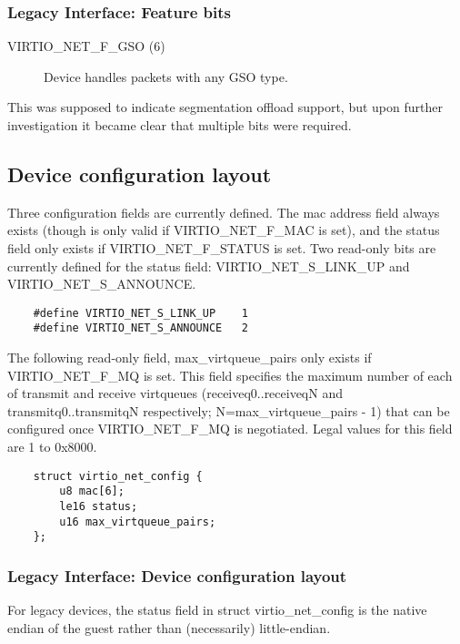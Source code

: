 \subsubsection{Legacy Interface: Feature bits}\label{sec:Device Types / Network Device / Feature bits / Legacy Interface: Feature bits}
\begin{description}
\item[VIRTIO_NET_F_GSO (6)] Device handles packets with any GSO type.
\end{description}

This was supposed to indicate segmentation offload support, but
upon further investigation it became clear that multiple bits
were required.

\subsection{Device configuration layout}\label{sec:Device Types / Network Device / Device configuration layout}

Three configuration fields are currently defined. The mac address field
always exists (though is only valid if VIRTIO_NET_F_MAC is set), and
the status field only exists if VIRTIO_NET_F_STATUS is set. Two
read-only bits are currently defined for the status field:
VIRTIO_NET_S_LINK_UP and VIRTIO_NET_S_ANNOUNCE.

\begin{lstlisting}
	#define VIRTIO_NET_S_LINK_UP	1
	#define VIRTIO_NET_S_ANNOUNCE	2
\end{lstlisting}

The following read-only field, max_virtqueue_pairs only exists if
VIRTIO_NET_F_MQ is set. This field specifies the maximum number
of each of transmit and receive virtqueues (receiveq0..receiveqN
and transmitq0..transmitqN respectively;
 N=max_virtqueue_pairs - 1) that can be configured once VIRTIO_NET_F_MQ
is negotiated.  Legal values for this field are 1 to 0x8000.

\begin{lstlisting}
	struct virtio_net_config {
		u8 mac[6];
		le16 status;
		u16 max_virtqueue_pairs;
	};
\end{lstlisting}

\subsubsection{Legacy Interface: Device configuration layout}\label{sec:Device Types / Network Device / Device configuration layout / Legacy Interface: Device configuration layout}
For legacy devices, the status field in struct virtio_net_config is the
native endian of the guest rather than (necessarily) little-endian.



